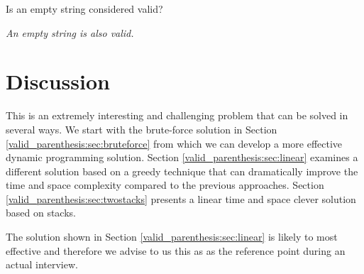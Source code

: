 \begin{QandA}
	\begin{questionitem} \begin{question} Is an empty string considered valid?  \end{question} 	 
    \begin{answered}
		\textit{An empty string is also valid.}
	\end{answered} \end{questionitem}
	
\end{QandA}

\section{Discussion}
\label{valid_parenthesis:sec:discussion}
This is an extremely interesting and challenging problem that can be solved in several ways. We start with the brute-force solution in Section \ref{valid_parenthesis:sec:bruteforce} from which we can develop a more effective dynamic programming solution.  
Section \ref{valid_parenthesis:sec:linear} examines a different solution based on a greedy technique that can dramatically improve the time and space complexity compared to the previous approaches. Section \ref{valid_parenthesis:sec:twostacks} presents a linear time and space clever solution based on stacks.

The solution shown in Section \ref{valid_parenthesis:sec:linear} is likely to most effective and therefore we advise to us this as as the reference point during an actual interview.


